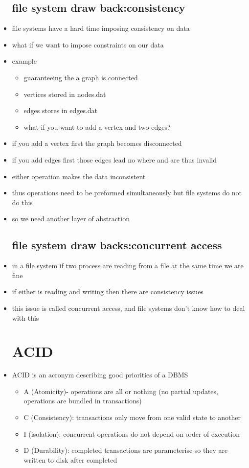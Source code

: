 \documentclass{article}
\begin{document}
\begin{itemize}
\subsection{file system draw back:consistency}
\item  file systems have a hard time imposing consistency on data
\item what if we want to impose constraints on our data 
\item example
\begin{itemize}
    \item guaranteeing the a graph is connected
    \item vertices stored in nodes.dat
    \item edges stores in edges.dat
    \item what if you want to add a vertex and two edges?
\end{itemize}
\item if you add a vertex first the graph becomes disconnected
\item if you add edges first those edges lead no where and are thus invalid 
\item either operation makes the data inconsistent 
\item thus operations need to be preformed simultaneously but file systems do not do this 
\item so we need another layer of abstraction 
\subsection{file system draw backs:concurrent access}
\item in a file system if two process are reading from a file at the same time we are fine 
\item if either is reading and  writing then there are consistency issues
\item this issue is called concurrent access, and file systems don't know how to deal with this 

\section{ACID}
\item ACID is an acronym describing good priorities of a DBMS
\begin{itemize}
    \item A (Atomicity)- operations are all or nothing (no partial updates, operations are bundled in transactions)
    \item C (Consistency): transactions only move from one valid state to another
    \item I (isolation): concurrent operations do not depend on order of execution 
    \item D (Durability): completed transactions are parameterise so they are written to disk after completed 
\end{itemize}

\end{itemize}
\end{document}
